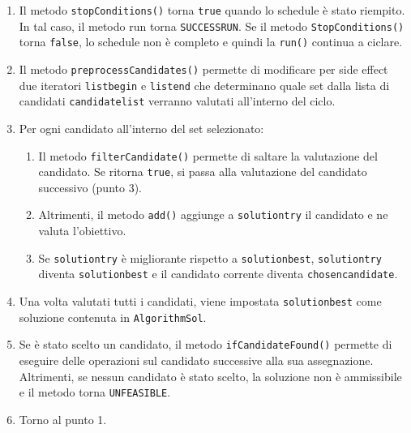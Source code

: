 \begin{enumerate}
    \item Il metodo \texttt{stopConditions()} torna \texttt{true} quando lo schedule è stato riempito. In tal caso, il metodo run torna \texttt{SUCCESS\textunderscore RUN}. Se il metodo \texttt{StopConditions()} torna \texttt{false}, lo schedule non è completo e quindi la \texttt{run()} continua a ciclare.
    \item Il metodo \texttt{preprocessCandidates()} permette di modificare per side effect due iteratori \texttt{list\textunderscore begin} e \texttt{list\textunderscore end} che determinano quale set dalla lista di candidati \texttt{candidate\textunderscore list} verranno valutati all'interno del ciclo.
    \item Per ogni candidato all'interno del set selezionato:
    \begin{enumerate}
        \item Il metodo \texttt{filterCandidate()} permette di saltare la valutazione del candidato. Se ritorna \texttt{true}, si passa alla valutazione del candidato successivo (punto 3).
        \item Altrimenti, il metodo \texttt{add()} aggiunge a \texttt{solution\textunderscore try} il candidato e ne valuta l'obiettivo.
        \item Se \texttt{solution\textunderscore try} è migliorante rispetto a  \texttt{solution\textunderscore best}, \texttt{solution\textunderscore try} diventa \texttt{solution\textunderscore best} e il candidato corrente diventa \texttt{chosen\textunderscore candidate}.
    \end{enumerate}
\item Una volta valutati tutti i candidati, viene impostata \texttt{solution\textunderscore best} come soluzione contenuta in \texttt{AlgorithmSol}.
\item Se è stato scelto un candidato, il metodo \texttt{ifCandidateFound()} permette di eseguire delle operazioni sul candidato successive alla sua assegnazione. Altrimenti, se nessun candidato è stato scelto, la soluzione non è ammissibile e il metodo torna \texttt{UNFEASIBLE}. 
\item Torno al punto 1.
\end{enumerate}
\newpage

